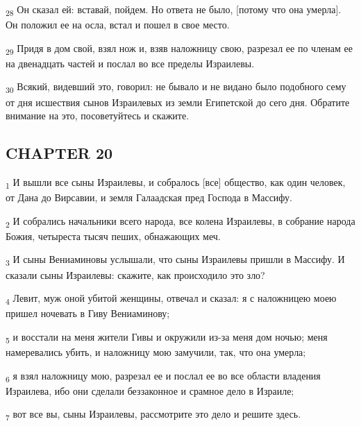 \begin{tcolorbox}
\textsubscript{28} Он сказал ей: вставай, пойдем. Но ответа не было, [потому что она умерла]. Он положил ее на осла, встал и пошел в свое место.
\end{tcolorbox}
\begin{tcolorbox}
\textsubscript{29} Придя в дом свой, взял нож и, взяв наложницу свою, разрезал ее по членам ее на двенадцать частей и послал во все пределы Израилевы.
\end{tcolorbox}
\begin{tcolorbox}
\textsubscript{30} Всякий, видевший это, говорил: не бывало и не видано было подобного сему от дня исшествия сынов Израилевых из земли Египетской до сего дня. Обратите внимание на это, посоветуйтесь и скажите.
\end{tcolorbox}
\subsection{CHAPTER 20}
\begin{tcolorbox}
\textsubscript{1} И вышли все сыны Израилевы, и собралось [все] общество, как один человек, от Дана до Вирсавии, и земля Галаадская пред Господа в Массифу.
\end{tcolorbox}
\begin{tcolorbox}
\textsubscript{2} И собрались начальники всего народа, все колена Израилевы, в собрание народа Божия, четыреста тысяч пеших, обнажающих меч.
\end{tcolorbox}
\begin{tcolorbox}
\textsubscript{3} И сыны Вениаминовы услышали, что сыны Израилевы пришли в Массифу. И сказали сыны Израилевы: скажите, как происходило это зло?
\end{tcolorbox}
\begin{tcolorbox}
\textsubscript{4} Левит, муж оной убитой женщины, отвечал и сказал: я с наложницею моею пришел ночевать в Гиву Вениаминову;
\end{tcolorbox}
\begin{tcolorbox}
\textsubscript{5} и восстали на меня жители Гивы и окружили из-за меня дом ночью; меня намеревались убить, и наложницу мою замучили, так, что она умерла;
\end{tcolorbox}
\begin{tcolorbox}
\textsubscript{6} я взял наложницу мою, разрезал ее и послал ее во все области владения Израилева, ибо они сделали беззаконное и срамное дело в Израиле;
\end{tcolorbox}
\begin{tcolorbox}
\textsubscript{7} вот все вы, сыны Израилевы, рассмотрите это дело и решите здесь.
\end{tcolorbox}
